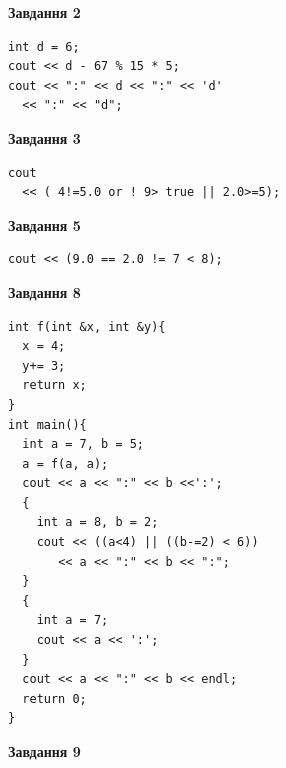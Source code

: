 \documentclass[12pt, ukrainian]{article}
\begin{document}
{\begin {large}
\begin{minipage}[t]{7.0cm}
\end{minipage}
\vline \hspace{1mm}
\begin{minipage}[t]{11.0cm}

\begin{center}
\textbf{Завдання 2}
\end{center}
\vspace{-8mm}

\begin{verbatim}
int d = 6;
cout << d - 67 % 15 * 5;
cout << ":" << d << ":" << 'd' 
  << ":" << "d";
\end{verbatim}



\begin{center}
\textbf{Завдання 3}
\end{center}
\vspace{-8mm}

\begin{verbatim}
cout 
  << ( 4!=5.0 or ! 9> true || 2.0>=5);
\end{verbatim}



\begin{center}
\textbf{Завдання 5}
\end{center}
\vspace{-8mm}

\begin{verbatim}
cout << (9.0 == 2.0 != 7 < 8);
\end{verbatim}



\begin{center}
\textbf{Завдання 8}
\end{center}
\vspace{-8mm}

\begin{verbatim}
int f(int &x, int &y){
  x = 4;
  y+= 3;
  return x;
}
int main(){
  int a = 7, b = 5;
  a = f(a, a);
  cout << a << ":" << b <<':';
  {
    int a = 8, b = 2;
    cout << ((a<4) || ((b-=2) < 6))
       << a << ":" << b << ":";
  }
  {
    int a = 7;
    cout << a << ':';
  }
  cout << a << ":" << b << endl;
  return 0;
}
\end{verbatim}

\end{minipage}


\begin{minipage}[t]{7.0cm}

\begin{center}
\textbf{Завдання 9}
\end{center}
\vspace{-8mm}


\end{minipage}
\end{large}}
\end{document}
